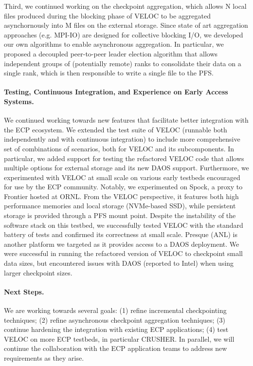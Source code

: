 Third, we continued working on the checkpoint aggregation, which allows
N local files produced during the blocking phase of VELOC to be aggregated
asynchornously into M files on the external storage. Since state of
art aggregation approaches (e.g. MPI-IO) are designed for collective
blocking I/O, we developed our own algorithms to enable asynchronous
aggregation. In particular, we proposed a decoupled peer-to-peer
leader election algorithm that allows independent groups of (potentially
remote) ranks to consolidate their data on a single rank, which is then
responsible to write a single file to the PFS.

\paragraph{Testing, Continuous Integration, and Experience on Early Access Systems.}
We continued working towards new features that facilitate better
integration with the ECP ecosystem. We extended the test suite of
VELOC (runnable both independently and with continuous integration) to
include more comprehensive set of combinations of scenarios, both for
VELOC and its subcomponents. In particular, we added support for
testing the refactored VELOC code that allows multiple options for
external storage and its new DAOS support. Furthermore, we
experimented with VELOC at small scale on various early testbeds
encouraged for use by the ECP community. Notably, we experimented on
Spock, a proxy to Frontier hosted at ORNL. From the VELOC perspective,
it features both high performance memories and local storage
(NVMe-based SSD), while persistent storage is provided through a PFS
mount point. Despite the instability of the software stack on this
testbed, we successfully tested VELOC with the standard battery of
tests and confirmed its correctness at small scale. Presque (ANL) is
another platform we targeted as it provides access to a DAOS
deployment. We were successful in running the refactored version of
VELOC to checkpoint small data sizes, but encountered issues with DAOS
(reported to Intel) when using larger checkpoint sizes.

\paragraph{Next Steps.}
We are working towards several goals: (1) refine incremental
checkpointing techniques; (2) refine asynchronous checkpoint
aggregation techniques; (3) continue hardening the integration with
existing ECP applications; (4) test VELOC on more ECP testbeds, in
particular CRUSHER. In parallel, we will continue the collaboration
with the ECP application teams to address new requirements as they
arise.
